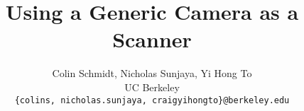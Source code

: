 \documentclass[10pt,twocolumn,letterpaper]{article}
\begin{document}
\title{Using a Generic Camera as a Scanner}

\author{
Colin Schmidt, Nicholas Sunjaya, Yi Hong To\\
UC Berkeley\\
{\tt\small \{colins, nicholas.sunjaya, craigyihongto\}@berkeley.edu}
}

\maketitle










{\small


}
\end{document}
